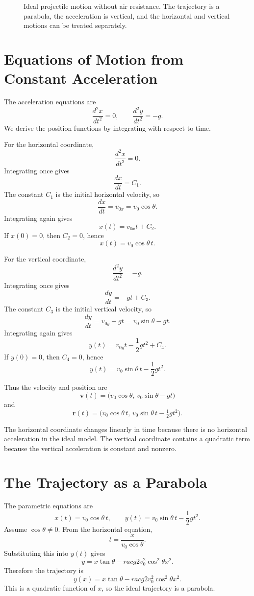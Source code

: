 \begin{figure}[h]
\centering

\caption{Ideal projectile motion without air resistance. The trajectory is a
parabola, the acceleration is vertical, and the horizontal and vertical motions
can be treated separately.}
\end{figure}

\section{Equations of Motion from Constant Acceleration}

The acceleration equations are
\[
\frac{d^2x}{dt^2}=0,
\qquad
\frac{d^2y}{dt^2}=-g.
\]
We derive the position functions by integrating with respect to time.

For the horizontal coordinate,
\[
\frac{d^2x}{dt^2}=0.
\]
Integrating once gives
\[
\frac{dx}{dt}=C_1.
\]
The constant \(C_1\) is the initial horizontal velocity, so
\[
\frac{dx}{dt}=v_{0x}=v_0\cos\theta.
\]
Integrating again gives
\[
x(t)=v_{0x}t+C_2.
\]
If \(x(0)=0\), then \(C_2=0\), hence
\[
\boxed{x(t)=v_0\cos\theta\, t.}
\]

For the vertical coordinate,
\[
\frac{d^2y}{dt^2}=-g.
\]
Integrating once gives
\[
\frac{dy}{dt}=-gt+C_3.
\]
The constant \(C_3\) is the initial vertical velocity, so
\[
\frac{dy}{dt}=v_{0y}-gt=v_0\sin\theta-gt.
\]
Integrating again gives
\[
y(t)=v_{0y}t-\frac{1}{2}gt^2+C_4.
\]
If \(y(0)=0\), then \(C_4=0\), hence
\[
\boxed{y(t)=v_0\sin\theta\, t-\frac{1}{2}gt^2.}
\]

Thus the velocity and position are
\[
\boxed{\mathbf{v}(t)=\bigl(v_0\cos\theta,\,v_0\sin\theta-gt\bigr)}
\]
and
\[
\boxed{\mathbf{r}(t)=\bigl(v_0\cos\theta\,t,\,v_0\sin\theta\,t-
\tfrac{1}{2}gt^2\bigr).}
\]

\begin{remarkbox}
The horizontal coordinate changes linearly in time because there is no
horizontal acceleration in the ideal model. The vertical coordinate contains a
quadratic term because the vertical acceleration is constant and nonzero.
\end{remarkbox}

\section{The Trajectory as a Parabola}

The parametric equations are
\[
x(t)=v_0\cos\theta\,t,
\qquad
y(t)=v_0\sin\theta\,t-\frac{1}{2}gt^2.
\]
Assume \(\cos\theta\neq 0\). From the horizontal equation,
\[
t=\frac{x}{v_0\cos\theta}.
\]
Substituting this into \(y(t)\) gives
\[
y=x\tan\theta-rac{g}{2v_0^2\cos^2\theta}x^2.
\]
Therefore the trajectory is
\[
\boxed{y(x)=x\tan\theta-rac{g}{2v_0^2\cos^2\theta}x^2.}
\]
This is a quadratic function of \(x\), so the ideal trajectory is a parabola.

